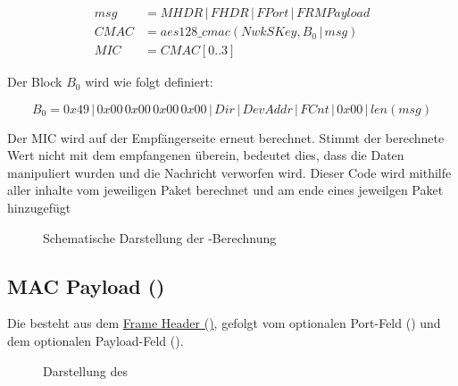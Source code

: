 	\begin{align*}
		msg &= MHDR \,|\, FHDR \,|\, FPort \,|\, FRMPayload \\
		CMAC &= aes128\_cmac(NwkSKey, B_0 \,|\, msg)	\\
		MIC &= CMAC[0..3]
	\end{align*}
	
	Der Block \( B_0 \) wird wie folgt definiert:  
	
	\[
	B_0 = 0x49 \,|\, 0x00\,0x00\,0x00\,0x00 \,|\, Dir \,|\, DevAddr \,|\, FCnt \,|\, 0x00 \,|\, len(msg)
	\]
	
	Der MIC wird auf der Empfängerseite erneut berechnet. Stimmt der berechnete Wert nicht mit dem empfangenen überein, bedeutet dies, dass die Daten manipuliert wurden und die Nachricht verworfen wird. Dieser Code wird mithilfe aller inhalte vom jeweiligen Paket berechnet und am ende eines jeweilgen Paket hinzugefügt \cite[25]{LoRaAlliance:2020b}
	
		\begin{figure}[H]
		\centering
		\caption{Schematische Darstellung der -Berechnung \cite{Montagny:2022}}
	\end{figure}
	
		
\subsection{MAC Payload () \label{lorawan:macPayload}}
	Die  besteht aus dem \hyperref[lorawan:frameHeader]{Frame Header ()}, gefolgt vom optionalen Port-Feld () und dem optionalen Payload-Feld ().
	\begin{figure}[H]
		\centering
		\caption{Darstellung des  \cite{LoRaAlliance:2020b}}
	\end{figure}
	
